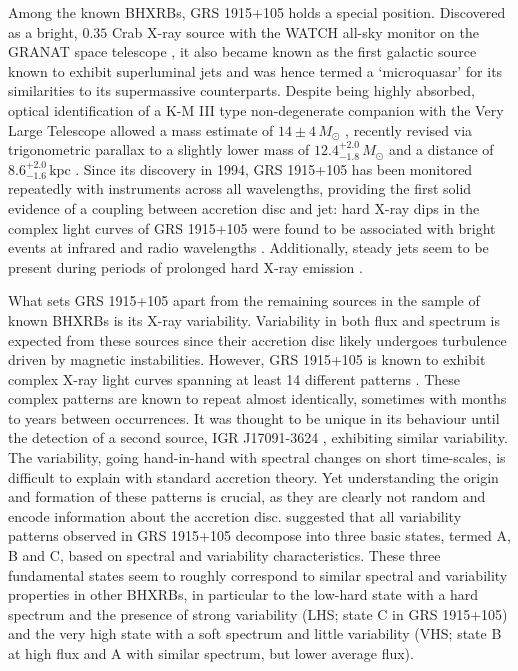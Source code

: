 \documentclass[fleqn,usenatbib]{mnras}
\begin{document}
Among the known BHXRBs, GRS 1915+105 holds a special position. Discovered as a bright, $0.35$ Crab X-ray source \citep{castrotirado1994} with the WATCH all-sky monitor on the GRANAT space telescope \citep{castrotirado1992}, it also became known as the first galactic source known to exhibit superluminal jets \citep{mirabel1994, fender1999} and was hence termed a `microquasar' for its similarities to its supermassive counterparts. 
Despite being highly absorbed, optical identification of a K-M III type non-degenerate companion with the Very Large Telescope allowed a mass estimate of $14\pm 4\,M_\odot$ \citep{greiner2001}, recently revised via trigonometric parallax to a slightly lower mass of $12.4^{+2.0}_{-1.8}\, M_\odot$ and a distance of $8.6^{+2.0}_{-1.6}\,\mathrm{kpc}$ \citep{reid2014}. 
Since its discovery in 1994, GRS 1915+105 has been monitored repeatedly with instruments across all wavelengths, providing the first solid evidence of a coupling between accretion disc and jet: hard X-ray dips in the complex light curves of GRS 1915+105 were found to be associated with bright events at infrared and radio wavelengths \citep{pooley1997, eikenberry1998a, eikenberry1998b, kleinwolt2002}. Additionally, steady jets seem to be present during periods of prolonged hard X-ray emission \citep{foster1996, dhawan2000, fuchs2003}. 

What sets GRS 1915+105 apart from the remaining sources in the sample of known BHXRBs is its X-ray variability. Variability in both flux and spectrum is expected from these sources since their accretion disc likely undergoes turbulence driven by magnetic instabilities. However, GRS 1915+105 is known to exhibit complex X-ray light curves spanning at least 14 different patterns \citep{belloni2000, kleinwolt2002, hannikainen2003, hannikainen2005}. These complex patterns are known to repeat almost identically, sometimes with months to years between occurrences. It was thought to be unique in its behaviour until the detection of a second source, IGR J17091-3624 \citep{altamirano2011}, exhibiting similar variability. 
The variability, going hand-in-hand with spectral changes on short time-scales, is difficult to explain with standard accretion theory. Yet understanding the origin and formation of these patterns is crucial, as they are clearly not random and encode information about the accretion disc. \citet{belloni1997a, belloni1997b, belloni2000} suggested that all variability patterns observed in GRS 1915+105 decompose into three basic states, termed A, B and C, based on spectral and variability characteristics. These three fundamental states seem to roughly correspond to similar spectral and variability properties in other BHXRBs, in particular to the low-hard state with a hard spectrum and the presence of strong variability (LHS; state C in GRS 1915+105) and the very high state with a soft spectrum and little variability (VHS; state B at high flux and A with similar spectrum, but lower average flux).
\end{document}
